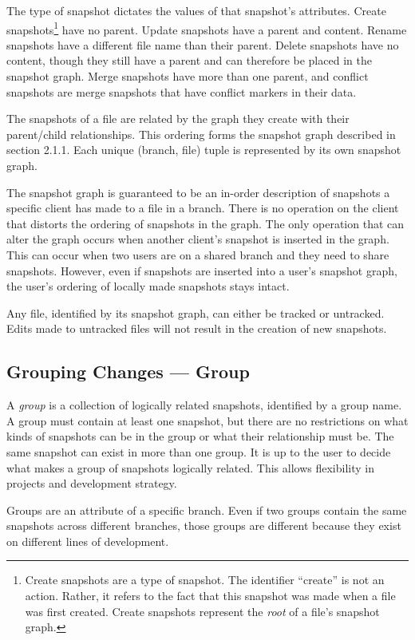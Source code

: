 The type of snapshot dictates the values of that snapshot's attributes. Create snapshots\footnote{Create snapshots are a type of snapshot. The identifier ``create'' is not an action. Rather, it refers to the fact that this snapshot was made when a file was first created. Create snapshots represent the \textit{root} of a file's snapshot graph.} have no parent. Update snapshots have a parent and content. Rename snapshots have a different file name than their parent. Delete snapshots have no content, though they still have a parent and can therefore be placed in the snapshot graph. Merge snapshots have more than one parent, and conflict snapshots are merge snapshots that have conflict markers in their data.

The snapshots of a file are related by the graph they create with their parent/child relationships. This ordering forms the snapshot graph described in section 2.1.1. Each unique (branch, file) tuple is represented by its own snapshot graph.

The snapshot graph is guaranteed to be an in-order description of snapshots a specific client has made to a file in a branch. There is no operation on the client that distorts the ordering of snapshots in the graph. The only operation that can alter the graph occurs when another client's snapshot is inserted in the graph. This can occur when two users are on a shared branch and they need to share snapshots. However, even if snapshots are inserted into a user's snapshot graph, the user's ordering of locally made snapshots stays intact.

Any file, identified by its snapshot graph, can either be tracked or untracked. Edits made to untracked files will not result in the creation of new snapshots.

\subsection{Grouping Changes --- Group}

A \textit{group} is a collection of logically related snapshots, identified by a group name. A group must contain at least one snapshot, but there are no restrictions on what kinds of snapshots can be in the group or what their relationship must be. The same snapshot can exist in more than one group. It is up to the user to decide what makes a group of snapshots logically related. This allows flexibility in projects and development strategy.

Groups are an attribute of a specific branch. Even if two groups contain the same snapshots across different branches, those groups are different because they exist on different lines of development.

